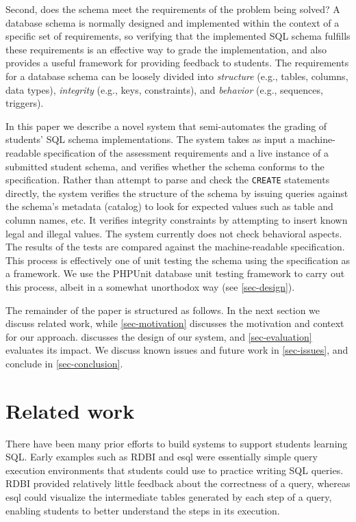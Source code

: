 \documentclass[sigconf, authordraft, capitalise]{acmart}
\begin{document}
Second, does the schema meet the requirements of the problem being solved? A database schema is normally designed and implemented within the context of a specific set of requirements, so verifying that the implemented SQL schema fulfills these requirements is an effective way to grade the implementation, and also provides a useful framework for providing feedback to students. The requirements for a database schema can be loosely divided into \emph{structure} (e.g., tables, columns, data types), \emph{integrity} (e.g., keys, constraints), and \emph{behavior} (e.g., sequences, triggers).

In this paper we describe a novel system that semi-automates the grading of students' SQL schema implementations. The system takes as input a machine-readable specification of the assessment requirements and a live instance of a submitted student schema, and verifies whether the schema conforms to the specification. Rather than attempt to parse and check the \texttt{CREATE} statements directly, the system verifies the structure of the schema by issuing queries against the schema's metadata (catalog) to look for expected values such as table and column names, etc. It verifies integrity constraints by attempting to insert known legal and illegal values. The system currently does not check behavioral aspects. The results of the tests are compared against the machine-readable specification. This process is effectively one of unit testing the schema using the specification as a framework. We use the PHPUnit database unit testing framework to carry out this process, albeit in a somewhat unorthodox way (see \cref{sec-design}).

The remainder of the paper is structured as follows. In the next section we discuss related work, while \cref{sec-motivation} discusses the motivation and context for our approach.  discusses the design of our system, and \cref{sec-evaluation} evaluates its impact. We discuss known issues and future work in \cref{sec-issues}, and conclude in \cref{sec-conclusion}.


\section{Related work}
\label{sec-literature}

There have been many prior efforts to build systems to support students learning SQL. Early examples such as RDBI \cite{Dietrich.S-1993a-An-educational} and esql \cite{Kearns.R-1997a-A-teaching} were essentially simple query execution environments that students could use to practice writing SQL queries. RDBI provided relatively little feedback about the correctness of a query, whereas esql could visualize the intermediate tables generated by each step of a query, enabling students to better understand the steps in its execution.
\end{document}
